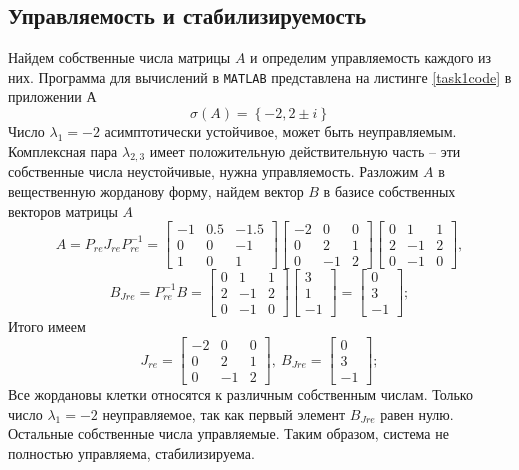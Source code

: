 \documentclass[a4paper, 12pt]{article}
\begin{document}
    \subsection{Управляемость и стабилизируемость}
    Найдем собственные числа матрицы $A$ и определим управляемость каждого из них. Программа для
    вычислений в \texttt{MATLAB} представлена на листинге \ref{task1code} в приложении А
    $$
    \sigma\left( A \right)=\left\{-2,2\pm i\right\}
    $$
    Число $\lambda_1=-2$ асимптотически устойчивое, может быть неуправляемым. Комплексная пара $\lambda_{2,3}$
    имеет положительную действительную часть -- эти собственные числа неустойчивые, нужна управляемость.
    Разложим $A$ в вещественную жорданову форму, найдем вектор $B$ в базисе собственных векторов матрицы $A$
    $$
    A=P_{re}J_{re}P_{re}^{-1}=\begin{bmatrix}
    -1    &0.5   &-1.5\\
    0         &0   &-1\\
    1         &0    &1
    \end{bmatrix}\begin{bmatrix}
    -2     &0     &0\\
     0     &2     &1\\
     0    &-1     &2
    \end{bmatrix}\begin{bmatrix}
    0     &1     &1\\
     2    &-1     &2\\
     0    &-1     &0
    \end{bmatrix},
    $$
    $$
    B_{Jre}=P_{re}^{-1}B=\begin{bmatrix}
        0     &1     &1\\
         2    &-1     &2\\
         0    &-1     &0
        \end{bmatrix}\begin{bmatrix}
            3\\
            1\\
            -1
        \end{bmatrix}=\begin{bmatrix}
        0\\
     3\\
    -1
    \end{bmatrix};
    $$
    Итого имеем
    $$
    J_{re}=\begin{bmatrix}
        -2     &0     &0\\
         0     &2     &1\\
         0    &-1     &2
        \end{bmatrix},\ B_{Jre}=\begin{bmatrix}
            0\\
         3\\
        -1
        \end{bmatrix};
    $$
    Все жордановы клетки относятся к различным собственным числам. Только число $\lambda_1=-2$ неуправляемое,
    так как первый элемент $B_{Jre}$ равен нулю. Остальные собственные числа управляемые. Таким образом,
    система не полностью управляема, стабилизируема.
\end{document}
